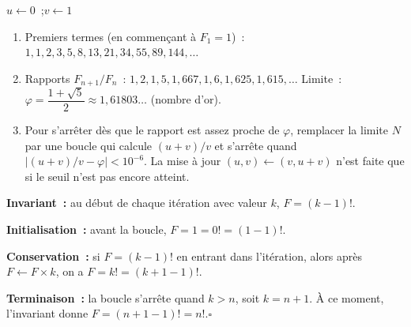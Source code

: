 
\begin{algorithm}[H]
\caption{Fibonacci et nombre d'or}
$u \leftarrow 0$~;\quad $v \leftarrow 1$\;
\end{algorithm}

\begin{enumerate}
  \item Premiers termes (en commen\c cant \`a $F_1=1$)~:
        $1,1,2,3,5,8,13,21,34,55,89,144,\ldots$
  \item Rapports $F_{n+1}/F_n$~: $1, 2, 1{,}5, 1{,}667, 1{,}6, 1{,}625, 1{,}615,\ldots$
        Limite~: $\varphi = \dfrac{1+\sqrt{5}}{2} \approx 1{,}61803\ldots$ (nombre d'or).
  \item Pour s'arr\^eter d\`es que le rapport est assez proche de $\varphi$,
        remplacer la limite $N$ par une boucle qui calcule $(u+v)/v$ et
        s'arr\^ete quand $\bigl|(u+v)/v-\varphi\bigr|<10^{-6}$.
        La mise \`a jour $(u,v)\leftarrow(v,u+v)$ n'est faite que si
        le seuil n'est pas encore atteint.
\end{enumerate}


\textbf{Invariant~:} au d\'ebut de chaque it\'eration avec valeur $k$,
$F = (k-1)!$.

\textbf{Initialisation~:} avant la boucle, $F=1=0!=(1-1)!$. \checkmark

\textbf{Conservation~:} si $F=(k-1)!$ en entrant dans l'it\'eration,
alors apr\`es $F\leftarrow F\times k$, on a $F=k!=(k+1-1)!$. \checkmark

\textbf{Terminaison~:} la boucle s'arr\^ete quand $k>n$, soit $k=n+1$.
\`A ce moment, l'invariant donne $F=(n+1-1)!=n!$.\hfill$\square$


